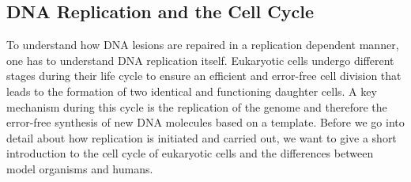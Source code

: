 \subsection{DNA Replication and the Cell Cycle}
To understand how DNA lesions are repaired in a replication dependent manner, one has to understand DNA replication itself. Eukaryotic cells undergo different stages during their life cycle to ensure an efficient and error-free cell division that leads to the formation of two identical and functioning daughter cells. A key mechanism during this cycle is the replication of the genome and therefore the error-free synthesis of new DNA molecules based on a template. Before we go into detail about how replication is initiated and carried out, we want to give a short introduction to the cell cycle of eukaryotic cells and the differences between model organisms and humans.

